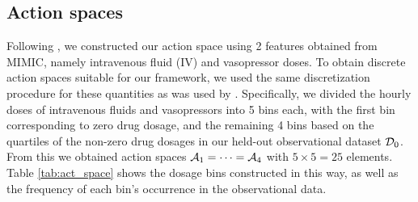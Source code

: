 
\subsection{Action spaces} \label{sec:action-space-definition-supp}

Following \cite{ai-clinician}, we constructed our action space using 2 features obtained from MIMIC, namely intravenous fluid (IV) and vasopressor doses.
To obtain discrete action spaces suitable for our framework, we used the same discretization procedure for these quantities as was used by \cite{ai-clinician}.
Specifically, we divided the hourly doses of intravenous fluids and vasopressors into 5 bins each, with the first bin corresponding to zero drug dosage, and the remaining 4 bins based on the quartiles of the non-zero drug dosages in our held-out observational dataset $\mathcal{D}_0$.
From this we obtained action spaces $\mathcal{A}_1 = \cdots = \mathcal{A}_{4}$ with $5 \times 5 = 25$ elements. 
Table \ref{tab:act_space} shows the dosage bins constructed in this way, as well as the frequency of each bin's occurrence in the observational data.




